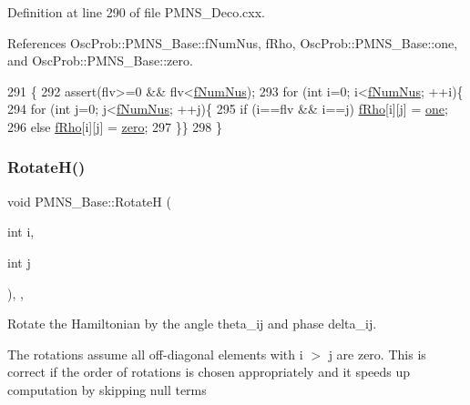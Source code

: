 Definition at line 290 of file P\+M\+N\+S\+\_\+\+Deco.\+cxx.



References Osc\+Prob\+::\+P\+M\+N\+S\+\_\+\+Base\+::f\+Num\+Nus, f\+Rho, Osc\+Prob\+::\+P\+M\+N\+S\+\_\+\+Base\+::one, and Osc\+Prob\+::\+P\+M\+N\+S\+\_\+\+Base\+::zero.


\begin{DoxyCode}
291 \{
292   assert(flv>=0 && flv<\hyperlink{classOscProb_1_1PMNS__Base_a24bb74bed63569dfe88b18fa6a08060e}{fNumNus});
293   \textcolor{keywordflow}{for} (\textcolor{keywordtype}{int} i=0; i<\hyperlink{classOscProb_1_1PMNS__Base_a24bb74bed63569dfe88b18fa6a08060e}{fNumNus}; ++i)\{
294   \textcolor{keywordflow}{for} (\textcolor{keywordtype}{int} j=0; j<\hyperlink{classOscProb_1_1PMNS__Base_a24bb74bed63569dfe88b18fa6a08060e}{fNumNus}; ++j)\{
295     \textcolor{keywordflow}{if} (i==flv && i==j) \hyperlink{classOscProb_1_1PMNS__Deco_a0488d62b4ef4cf5b43425769f5fcdbdf}{fRho}[i][j] = \hyperlink{classOscProb_1_1PMNS__Base_ab64aab27448a5aca27565c991a9d173e}{one};
296     \textcolor{keywordflow}{else}                \hyperlink{classOscProb_1_1PMNS__Deco_a0488d62b4ef4cf5b43425769f5fcdbdf}{fRho}[i][j] = \hyperlink{classOscProb_1_1PMNS__Base_a5c31ed4593cf95feb36fb80c1850d25e}{zero};
297   \}\}
298 \}
\end{DoxyCode}
\mbox{\label{classOscProb_1_1PMNS__Base_aae18afd69074211335f49ec40e6011b9}} 
\subsubsection{\texorpdfstring{Rotate\+H()}{RotateH()}}
{\footnotesize\ttfamily void P\+M\+N\+S\+\_\+\+Base\+::\+RotateH (\begin{DoxyParamCaption}\item[{int}]{i,  }\item[{int}]{j }\end{DoxyParamCaption})\hspace{0.3cm}{\ttfamily [protected]}, {\ttfamily [virtual]}, {\ttfamily [inherited]}}

Rotate the Hamiltonian by the angle theta\+\_\+ij and phase delta\+\_\+ij.

The rotations assume all off-\/diagonal elements with i $>$ j are zero. This is correct if the order of rotations is chosen appropriately and it speeds up computation by skipping null terms


